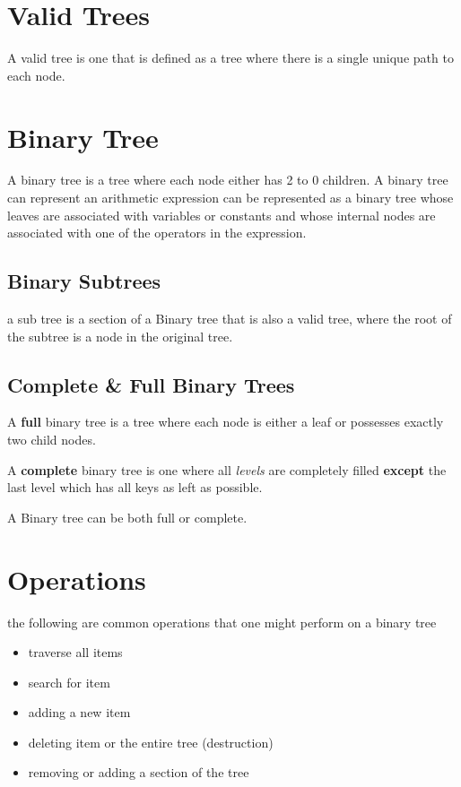 \documentclass[12pt]{book}
\title{\coursetitle\linebreak\lecturename}
\author{\\Cain Susko\\ 
           \\ \\ \\
      Queen's University 
    \\School of Computing\\}
\begin{document}
\begin{titlepage}
        \maketitle
\end{titlepage}


\section*{Valid Trees}
A valid tree is one that is defined as a tree where there is a single unique path to each node.

\section*{Binary Tree}
A binary tree is a tree where each node either has 2 to 0 children.
A binary tree can represent an arithmetic expression can be represented as a binary tree whose leaves are associated with 
        variables or constants and whose internal nodes are associated with one of the operators in the expression.

\subsection*{Binary Subtrees}
a sub tree is a section of a Binary tree that is also a valid tree, where the root of the subtree is a node in the original tree.

\subsection*{Complete \& Full Binary Trees}
A \textbf{full} binary tree is a tree where each node is either a leaf or possesses exactly two child nodes.

A \textbf{complete} binary tree is one where all \textit{levels} are completely filled \textbf{except} the last level which has all 
        keys as left as possible.

A Binary tree can be both full or complete.

\section*{Operations}
the following are common operations that one might perform on a binary tree
\begin{itemize}
        \item traverse all items
        \item search for item
        \item adding a new item
        \item deleting item or the entire tree (destruction)
        \item removing or adding a section of the tree
\end{itemize}
\end{document}
